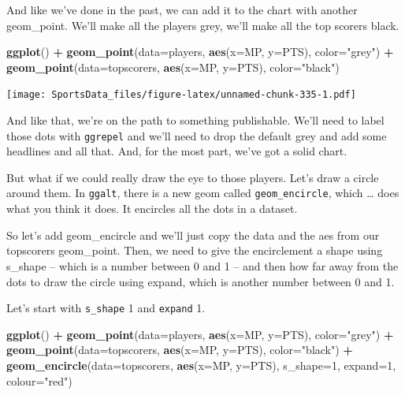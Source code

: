 \documentclass[]{book}
\newenvironment{Shaded}{\begin{snugshade}}{\end{snugshade}}
\newcommand{\DataTypeTok}[1]{\textcolor[rgb]{0.13,0.29,0.53}{#1}}
\newcommand{\DecValTok}[1]{\textcolor[rgb]{0.00,0.00,0.81}{#1}}
\newcommand{\KeywordTok}[1]{\textcolor[rgb]{0.13,0.29,0.53}{\textbf{#1}}}
\newcommand{\NormalTok}[1]{#1}
\newcommand{\OperatorTok}[1]{\textcolor[rgb]{0.81,0.36,0.00}{\textbf{#1}}}
\newcommand{\StringTok}[1]{\textcolor[rgb]{0.31,0.60,0.02}{#1}}
\begin{document}
And like we've done in the past, we can add it to the chart with another geom\_point. We'll make all the players grey, we'll make all the top scorers black.

\begin{Shaded}
\begin{Highlighting}[]
\KeywordTok{ggplot}\NormalTok{() }\OperatorTok{+}\StringTok{ }\KeywordTok{geom_point}\NormalTok{(}\DataTypeTok{data=}\NormalTok{players, }\KeywordTok{aes}\NormalTok{(}\DataTypeTok{x=}\NormalTok{MP, }\DataTypeTok{y=}\NormalTok{PTS), }\DataTypeTok{color=}\StringTok{"grey"}\NormalTok{) }\OperatorTok{+}\StringTok{ }\KeywordTok{geom_point}\NormalTok{(}\DataTypeTok{data=}\NormalTok{topscorers, }\KeywordTok{aes}\NormalTok{(}\DataTypeTok{x=}\NormalTok{MP, }\DataTypeTok{y=}\NormalTok{PTS), }\DataTypeTok{color=}\StringTok{"black"}\NormalTok{)}
\end{Highlighting}
\end{Shaded}

\texttt{[image: SportsData\_files/figure-latex/unnamed-chunk-335-1.pdf]}

And like that, we're on the path to something publishable. We'll need to label those dots with \texttt{ggrepel} and we'll need to drop the default grey and add some headlines and all that. And, for the most part, we've got a solid chart.

But what if we could really draw the eye to those players. Let's draw a circle around them.
In \texttt{ggalt}, there is a new geom called \texttt{geom\_encircle}, which \ldots{} does what you think it does. It encircles all the dots in a dataset.

So let's add geom\_encircle and we'll just copy the data and the aes from our topscorers geom\_point. Then, we need to give the encirclement a shape using s\_shape -- which is a number between 0 and 1 -- and then how far away from the dots to draw the circle using expand, which is another number between 0 and 1.

Let's start with \texttt{s\_shape} 1 and \texttt{expand} 1.

\begin{Shaded}
\begin{Highlighting}[]
\KeywordTok{ggplot}\NormalTok{() }\OperatorTok{+}\StringTok{ }
\StringTok{  }\KeywordTok{geom_point}\NormalTok{(}\DataTypeTok{data=}\NormalTok{players, }\KeywordTok{aes}\NormalTok{(}\DataTypeTok{x=}\NormalTok{MP, }\DataTypeTok{y=}\NormalTok{PTS), }\DataTypeTok{color=}\StringTok{"grey"}\NormalTok{) }\OperatorTok{+}\StringTok{ }
\StringTok{  }\KeywordTok{geom_point}\NormalTok{(}\DataTypeTok{data=}\NormalTok{topscorers, }\KeywordTok{aes}\NormalTok{(}\DataTypeTok{x=}\NormalTok{MP, }\DataTypeTok{y=}\NormalTok{PTS), }\DataTypeTok{color=}\StringTok{"black"}\NormalTok{) }\OperatorTok{+}\StringTok{ }
\StringTok{  }\KeywordTok{geom_encircle}\NormalTok{(}\DataTypeTok{data=}\NormalTok{topscorers, }\KeywordTok{aes}\NormalTok{(}\DataTypeTok{x=}\NormalTok{MP, }\DataTypeTok{y=}\NormalTok{PTS), }\DataTypeTok{s_shape=}\DecValTok{1}\NormalTok{, }\DataTypeTok{expand=}\DecValTok{1}\NormalTok{, }\DataTypeTok{colour=}\StringTok{"red"}\NormalTok{)}
\end{Highlighting}
\end{Shaded}
\end{document}
